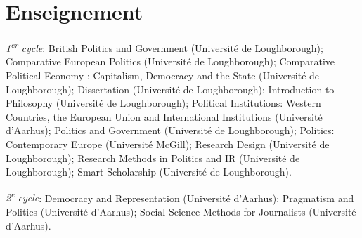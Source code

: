 \documentclass[letterpaper,fontsize=10.5pt]{scrartcl}
\begin{document}
\section{Enseignement}
{}\textit{1\textsuperscript{er} cycle}: British Politics and Government (Université de Loughborough); Comparative European Politics (Université de Loughborough); Comparative Political Economy : Capitalism, Democracy and the State (Université de Loughborough); Dissertation (Université de Loughborough); Introduction to Philosophy (Université de Loughborough); Political Institutions: Western Countries, the European Union and International Institutions (Université d'Aarhus); Politics and Government (Université de Loughborough); Politics: Contemporary Europe (Université McGill); Research Design (Université de Loughborough); Research Methods in Politics and IR (Université de Loughborough); Smart Scholarship (Université de Loughborough).\\
\hfill \break
{}
{}\textit{2\textsuperscript{e} cycle}: Democracy and Representation (Université d'Aarhus); Pragmatism and Politics (Université d'Aarhus); Social Science Methods for Journalists (Université d'Aarhus).

\end{document}
